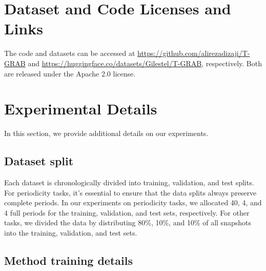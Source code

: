 

\section{Dataset and Code Licenses and Links} \label{appendix:licenses}
The code and datasets can be accessed at \url{https://github.com/alirezadizaji/T-GRAB} and \url{https://huggingface.co/datasets/Gilestel/T-GRAB}, respectively. Both are released under the Apache 2.0 license.


\section{Experimental Details}\label{appendix:experimental-details}
In this section, we provide additional details on our experiments.
\subsection{Dataset split}
Each dataset is chronologically divided into training, validation, and test splits. For periodicity tasks, it’s essential to ensure that the data splits always preserve complete periods. In our experiments on periodicity tasks, we allocated 40, 4, and 4 full periods for the training, validation, and test sets, respectively. For other tasks, we divided the data by distributing 80\%, 10\%, and 10\% of all snapshots into the training, validation, and test sets.

\subsection{Method training details}

